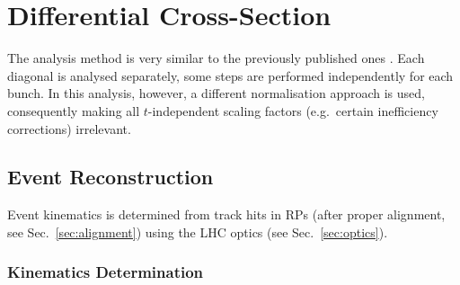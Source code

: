 \section{Differential Cross-Section}

The analysis method is very similar to the previously published ones \cite{epl101-el,prl111}. Each diagonal is analysed separately, some steps are performed independently for each bunch. In this analysis, however, a different normalisation approach is used, consequently making all $t$-independent scaling factors (e.g.~certain inefficiency corrections) irrelevant.

\subsection{Event Reconstruction}

Event kinematics is determined from track hits in RPs (after proper alignment, see Sec.~\ref{sec:alignment}) using the LHC optics (see Sec.~\ref{sec:optics}).


\subsubsection{Kinematics Determination}
\label{sec:kinematics}

